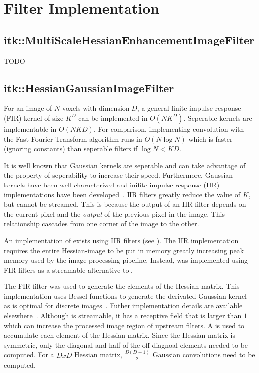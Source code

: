 \documentclass{InsightArticle}
\begin{document}
\section{Filter Implementation}
\label{sec:filter_implementation}

\subsection{itk::MultiScaleHessianEnhancementImageFilter}
\label{filter:MultiScaleHessianEnhancementImageFilter}
TODO

\subsection{itk::HessianGaussianImageFilter}
\label{filter:HessianGaussianImageFilter}
For an image of $N$ voxels with dimension $D$, a general finite impulse response (FIR) kernel of size $K^D$ can be implemented in $O(NK^D)$.
Seperable kernels are implementable in $O(NKD)$.
For comparison, implementing convolution with the Fast Fourier Transform algorithm runs in $O(N \log N)$ which is faster (ignoring constants) than seperable filters if $\log N < KD$.

It is well known that Gaussian kernels are seperable and can take advantage of the property of seperability to increase their speed.
Furthermore, Gaussian kernels have been well characterized and inifite impulse response (IIR) implementations have been developed~\cite{Deriche1993}.
IIR filters greatly reduce the value of $K$, but cannot be streamed.
This is because the output of an IIR filter depends on the current pixel and the \textit{output} of the previous pixel in the image.
This relationship cascades from one corner of the image to the other.

An implementation of  exists using IIR filters (see ).
The IIR implementation requires the entire Hessian-image to be put in memory greatly increasing peak memory used by the image processing pipeline.
Instead,  was implemented using FIR filters as a streamable alternative to .

The FIR filter  was used to generate the elements of the Hessian matrix.
This implementation uses Bessel functions to generate the derivated Gaussian kernel as is optimal for discrete images~\cite{lindeberg1990scale}.
Futher implementation details are available elsewhere~\cite{macia2007generalized}.
Although  is streamable, it has a receptive field that is larger than $1$ which can increase the processed image region of upstream filters.
A  is used to accumulate each element of the Hessian matrix.
Since the Hessian-matrix is symmetric, only the diagonal and half of the off-diagnoal elements needed to be computed.
For a $DxD$ Hessian matrix, $\frac{D(D+1)}{2}$ Gaussian convolutions need to be computed.
\end{document}
